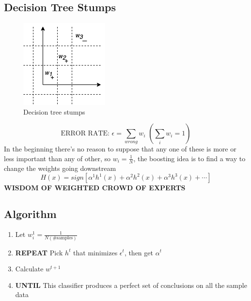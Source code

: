 \documentclass[12pt]{book}
\begin{document}
\subsection{Decision Tree Stumps}
\begin{figure}[ht]
	\centering
	\includegraphics[scale=0.8]{Figure/Figure17_5.png}
	\caption{Decision tree stumps}
\end{figure}
$$\text{ERROR RATE: }\epsilon=\sum_{wrong}w_i\,\,(\sum_i w_i = 1)$$
\indent In the beginning there's no reason to suppose that any one of these is more or less important than any of other, so $w_i=\frac{1}{N}$, the boosting idea is to find a way to change the weights going downstream
$$H(x)=sign[\alpha^1h^1(x)+\alpha^2h^2(x)+\alpha^3h^3(x)+\cdots]$$
\indent \textbf{WISDOM OF WEIGHTED CROWD OF EXPERTS}
\subsection{Algorithm}
\begin{enumerate}
	\item Let $w_i^1=\frac{1}{N(\text{\# samples})}$
	\item \textbf{REPEAT} Pick $h^t$ that minimizes $\epsilon^t$, then get $\alpha^t$
	\item Calculate $w^{t+1}$
	\item \textbf{UNTIL} This classifier produces a perfect set of conclusions on all the sample data
\end{enumerate}
\newpage
\end{document}
